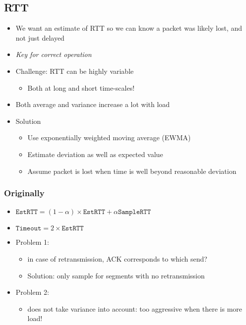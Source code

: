 \subsection{RTT}
\begin{itemize}[nosep]
    \item We want an estimate of RTT so we can know a packet was likely lost, and not just delayed
    \item \emph{Key for correct operation}
    \item Challenge: RTT can be highly variable
          \begin{itemize}[nosep]
              \item Both at long and short time-scales!
          \end{itemize}
    \item Both average and variance increase a lot with load
    \item Solution
          \begin{itemize}[nosep]
              \item Use exponentially weighted moving average (EWMA)
              \item Estimate deviation as well as expected value
              \item Assume packet is lost when time is well beyond reasonable deviation
          \end{itemize}
\end{itemize}

\subsubsection{Originally}
\begin{itemize}[nosep]
    \item $\texttt{EstRTT} = (1 - \alpha) \times \texttt{EstRTT} + \alpha\texttt{SampleRTT}$
    \item $\texttt{Timeout} = 2 \times \texttt{EstRTT}$
    \item Problem 1:
          \begin{itemize}[nosep]
              \item in case of retransmission, ACK corresponds to which send?
              \item Solution: only sample for segments with no retransmission
          \end{itemize}
    \item Problem 2:
          \begin{itemize}[nosep]
              \item does not take variance into account: too aggressive when there is more load!
          \end{itemize}
\end{itemize}

